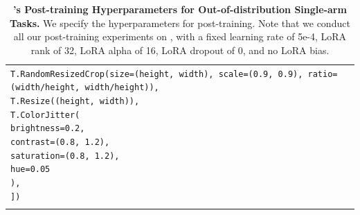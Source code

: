 \begin{table}[!htbp]
\begin{tabular}{l*{1}{>{\centering\arraybackslash}p{8.4cm}}}
{{\texttt{\hspace*{1em}T.RandomResizedCrop(size=(height, width), scale=(0.9, 0.9), ratio=(width/height, width/height)),}\\
\texttt{\hspace*{1em}T.Resize((height, width)),}\\
\texttt{\hspace*{1em}T.ColorJitter(}\\
\texttt{\hspace*{2em}brightness=0.2,}\\
\texttt{\hspace*{2em}contrast=(0.8, 1.2),}\\
\texttt{\hspace*{2em}saturation=(0.8, 1.2),}\\
\texttt{\hspace*{2em}hue=0.05}\\
\texttt{\hspace*{1em}),}\\
\texttt{])}
}} \\
\addlinespace[4pt]  
\bottomrule
\end{tabular}
\caption{\textbf{\molmoact's Post-training Hyperparameters for Out-of-distribution Single-arm Tasks.} We specify the hyperparameters for \molmoact post-training. Note that we conduct all our post-training experiments on \molmoactd, with a fixed learning rate of 5e-4, LoRA rank of 32, LoRA alpha of 16, LoRA dropout of 0, and no LoRA bias.}
\label{tab:hyperparams_real_outdist}
\end{table}